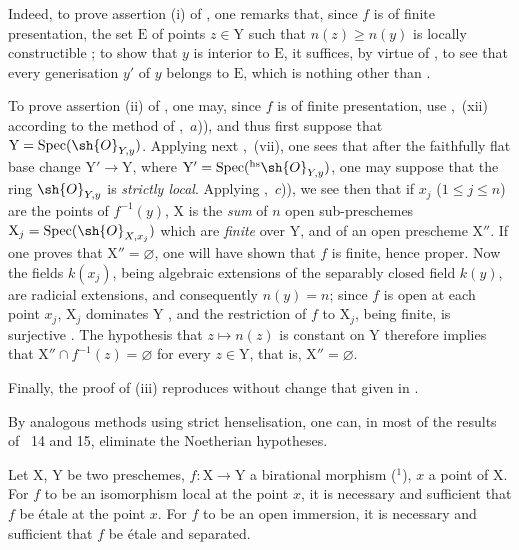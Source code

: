 Indeed, to prove assertion (i) of , one remarks that, since $f$ is of finite presentation, the set $\mathrm{E}$ of points $z\in\mathrm{Y}$ such that $n(z)\geq n(y)$ is locally constructible ; to show that $y$ is interior to $\mathrm{E}$, it suffices, by virtue of , to see that every generisation $y'$ of $y$ belongs to $\mathrm{E}$, which is nothing other than .

To prove assertion (ii) of , one may, since $f$ is of finite presentation, use ,~(xii) according to the method of ,~$a$)), and thus first suppose that $\mathrm{Y}=\operatorname{Spec}(\sh{O}_{Y,y})$. Applying next ,~(vii), one sees that after the faithfully flat base change $\mathrm{Y}'\to\mathrm{Y}$, where $\mathrm{Y}'=\operatorname{Spec}({}^{\mathrm{hs}}\sh{O}_{Y,y})$, one may suppose that the ring $\sh{O}_{Y,y}$ is \emph{strictly local}.
Applying ,~$c$)), we see then that if $x_j$ ($1\leq j\leq n$) are the points of $f^{-1}(y)$, $\mathrm{X}$ is the \emph{sum} of $n$ open sub-preschemes $\mathrm{X}_j=\operatorname{Spec}(\sh{O}_{X,x_j})$ which are \emph{finite} over $\mathrm{Y}$, and of an open prescheme $\mathrm{X}''$.
If one proves that $\mathrm{X}''=\varnothing$, one will have shown that $f$ is finite, hence proper. Now the fields $k(x_j)$, being algebraic extensions of the separably closed field $k(y)$, are radicial extensions, and consequently $n(y)=n$; since $f$ is open at each point $x_j$, $\mathrm{X}_j$ dominates $\mathrm{Y}$ , and the restriction of $f$ to $\mathrm{X}_j$, being finite, is surjective . The hypothesis that $z\mapsto n(z)$ is constant on $\mathrm{Y}$ therefore implies that $\mathrm{X}''\cap f^{-1}(z)=\varnothing$ for every $z\in\mathrm{Y}$, that is, $\mathrm{X}''=\varnothing$.

Finally, the proof of (iii) reproduces without change that given in .

\begin{env}[18.10.17.2]
\label{IV.18.10.17.2}
By analogous methods using strict henselisation, one can, in most of the results of \textsection\textsection~14 and 15, eliminate the Noetherian hypotheses.
\end{env}

\begin{lemma}[18.10.18]
\label{IV.18.10.18}
Let $\mathrm{X}$, $\mathrm{Y}$ be two preschemes, $f:\mathrm{X}\to\mathrm{Y}$ a birational morphism (${}^1$), $x$ a point of $\mathrm{X}$.
For $f$ to be an isomorphism local at the point $x$, it is necessary and sufficient that $f$ be \'etale at the point $x$.
For $f$ to be an open immersion, it is necessary and sufficient that $f$ be \'etale and separated.
\end{lemma}

